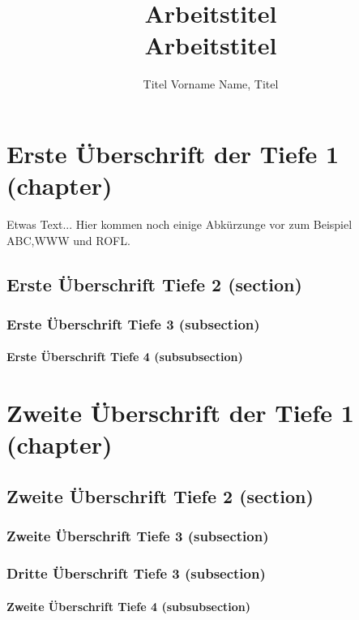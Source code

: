 \documentclass[Master,BMR,german]{BASE/twbook}
\title{Arbeitstitel\\Arbeitstitel}
\author{Titel Vorname Name, Titel}
\begin{document}
\maketitle
\chapter{Erste Überschrift der Tiefe 1 (chapter)}
Etwas Text... Hier kommen noch einige Abkürzunge vor zum Beispiel \ac{ABC},\ac{WWW} und \ac{ROFL}.

\section{Erste Überschrift Tiefe 2 (section)}
\blindtext

\subsection{Erste Überschrift Tiefe 3 (subsection)}
\blindtext

\subsubsection{Erste Überschrift Tiefe 4 (subsubsection)}
\blindtext

\chapter{Zweite Überschrift der Tiefe 1 (chapter)}
\blindtext

\section{Zweite Überschrift Tiefe 2 (section)}
\blindtext

\subsection{Zweite Überschrift Tiefe 3 (subsection)}
\blindtext

\subsection{Dritte Überschrift Tiefe 3 (subsection)}
\blindtext

\subsubsection{Zweite Überschrift Tiefe 4 (subsubsection)}
\blindtext
\end{document}
